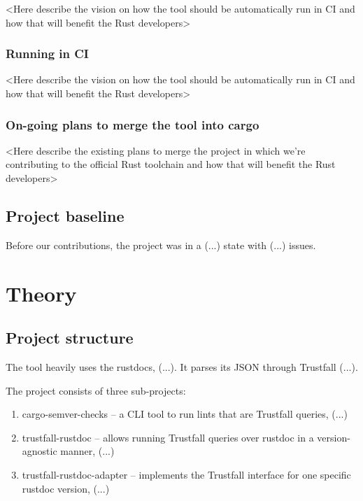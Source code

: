\documentclass[licencjacka,en]{pracamgr}
\begin{document}
<Here describe the vision on how the tool should be automatically run in CI
and how that will benefit the Rust developers>

\subsection{Running in CI}

<Here describe the vision on how the tool should be automatically run in CI
and how that will benefit the Rust developers>

\subsection{On-going plans to merge the tool into cargo}

<Here describe the existing plans to merge the project in which we're contributing
to the official Rust toolchain and how that will benefit the Rust developers>


\section{Project baseline}

Before our contributions, the project was in a (...) state
with (...) issues.




\chapter{Theory}\label{r:theory}

\section{Project structure}\label{r:projectstructure}

The tool heavily uses the rustdocs, (...).
It parses its JSON through Trustfall (...).

The project consists of three sub-projects:
\begin{enumerate}
	\item cargo-semver-checks -- a CLI tool to run lints that are Trustfall queries, (...)
	\item trustfall-rustdoc -- allows running Trustfall queries over rustdoc in a version-agnostic manner, (...)
	\item trustfall-rustdoc-adapter -- implements the Trustfall interface for one specific rustdoc version, (...)
\end{enumerate}
\end{document}
